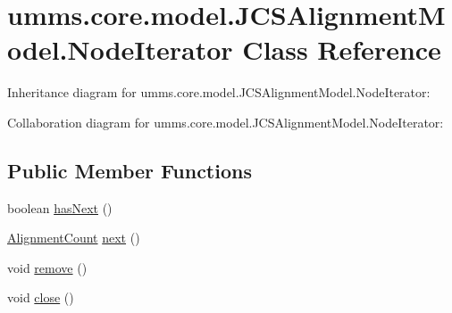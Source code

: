 \hypertarget{classumms_1_1core_1_1model_1_1_j_c_s_alignment_model_1_1_node_iterator}{\section{umms.\+core.\+model.\+J\+C\+S\+Alignment\+Model.\+Node\+Iterator Class Reference}
\label{classumms_1_1core_1_1model_1_1_j_c_s_alignment_model_1_1_node_iterator}
}


Inheritance diagram for umms.\+core.\+model.\+J\+C\+S\+Alignment\+Model.\+Node\+Iterator\+:


Collaboration diagram for umms.\+core.\+model.\+J\+C\+S\+Alignment\+Model.\+Node\+Iterator\+:
\subsection*{Public Member Functions}
\begin{DoxyCompactItemize}
\item 
boolean \hyperlink{classumms_1_1core_1_1model_1_1_j_c_s_alignment_model_1_1_node_iterator_a44cee8aed6450f14377be8155d00c2eb}{has\+Next} ()
\item 
\hyperlink{classumms_1_1core_1_1model_1_1_j_c_s_alignment_model_1_1_alignment_count}{Alignment\+Count} \hyperlink{classumms_1_1core_1_1model_1_1_j_c_s_alignment_model_1_1_node_iterator_a03e4f412302e339f6e8fc983d6785f40}{next} ()
\item 
void \hyperlink{classumms_1_1core_1_1model_1_1_j_c_s_alignment_model_1_1_node_iterator_a13d400345976cbb6ee612642ebb4b692}{remove} ()
\item 
void \hyperlink{classumms_1_1core_1_1model_1_1_j_c_s_alignment_model_1_1_node_iterator_a4ea6c85e5c0c2708ab2d534a4cf86f0c}{close} ()
\end{DoxyCompactItemize}



